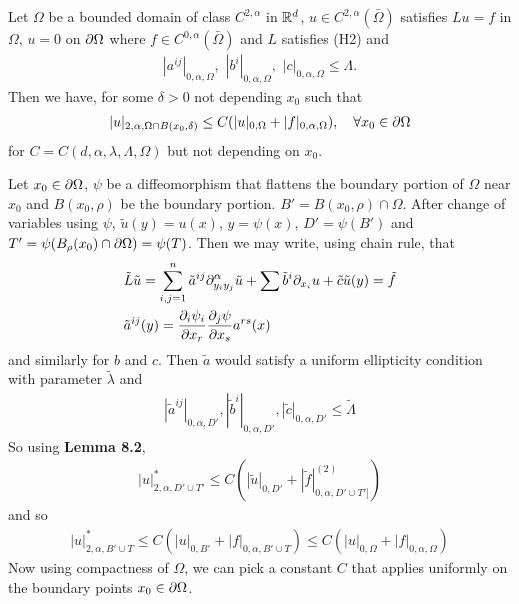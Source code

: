 \documentclass[12pt,a4paper]{article}
\newenvironment{proof}
{\begin{changemargin}{0.5cm}{0.5cm} 
	}%
	{\end{changemargin}
}
\newenvironment{p}
{\begin{proof} 
	}%
	{\end{proof}
}
\begin{document}
 Let $\Omega$ be a bounded domain of class $C^{2, \alpha}$ in $\mathbb{R}^d$, $u\in C^{2, \alpha}(\bar{\Omega})$ satisfies $Lu = f$ in $\Omega$, $u =0$ on $\partial \Omega$ where $f\in C^{0, \alpha}(\bar{\Omega})$ and $L$ satisfies (H2) and
\begin{align*}
|a^{ij}|_{0, \alpha, \Omega}, \,\, |b^{i}|_{0, \alpha, \Omega},\,\, |c|_{0, \alpha, \Omega} \leq \Lambda.
\end{align*}
Then we have, for some $\delta>0$ not depending $x_0$ such that
\begin{align*}
|u|_{2, \alpha, \Omega \cap B(x_0, \delta)} \leq C(|u|_{0, \Omega} + |f|_{0, \alpha, \Omega}), \quad \forall x_0 \in \partial \Omega
\end{align*} 
for $C = C(d, \alpha, \lambda, \Lambda, \Omega)$ but not depending on $x_0$.
\begin{p}
\pf Let $x_0 \in \partial \Omega$, $\psi$ be a diffeomorphism that flattens the boundary portion of $\Omega$ near $x_0$ and $B(x_0, \rho)$ be the boundary portion. $B' = B(x_0, \rho) \cap \Omega$. After change of variables using $\psi$, $\tilde{u}(y) = u(x)$, $y = \psi(x)$, $D' = \psi(B')$ and $T' = \psi(B_\rho(x_0) \cap \partial \Omega) = \psi(T)$. Then we may write, using chain rule, that 
\begin{align*}
&\tilde{L}\tilde{u}= \sum_{i,j=1}^n \tilde{a}^{ij} \partial_{y_i y_j}^{\alpha} \tilde{u} + \sum \tilde{b}^i \partial_{x_i} u + \tilde{c}\tilde{u}(y) = \tilde{f} \\
&\tilde{a}^{ij}(y) = \frac{\partial_i \psi_i}{\partial x_r} \frac{\partial_j \psi}{\partial x_s} a^{rs}(x)
\end{align*}
and similarly for $b$ and $c$. Then $\tilde{a}$ would satisfy a uniform ellipticity condition with parameter $\tilde{\lambda}$ and
\begin{align*}
|\tilde{a}^{ij}|_{0, \alpha, D'}, |\tilde{b}^i|_{0, \alpha, D'}, |\tilde{c}|_{0, \alpha, D'}\leq \tilde{\Lambda} 
\end{align*}
So using \textbf{Lemma 8.2},
\begin{align*}
|u|^*_{2, \alpha, D' \cup T'} \leq C(|\tilde{u}|_{0, D'} + |\tilde{f}|^{(2)}_{0, \alpha, D' \cup T']})
\end{align*}
and so
\begin{align*}
|u|^*_{2,\alpha, B'\cup T} \leq  C(|u|_{0, B'} + |f|_{0, \alpha, B'\cup T}) \leq C(|u|_{0, \Omega}+ |f|_{0, \alpha, \Omega})
\end{align*}
Now using compactness of $\Omega$, we can pick a constant $C$ that applies uniformly on the boundary points $x_0 \in \partial \Omega$.
\s

\eop
\end{p}
\end{document}
